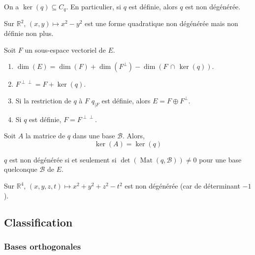   \begin{proposition}
    On a $\ker(q) \subseteq C_q$. En particulier, si $q$ est définie, alors $q$ est non dégénérée.
  \end{proposition}

  \begin{example}
    Sur $\mathbb{R}^2$, $(x, y) \mapsto x^2 - y^2$ est une forme quadratique non dégénérée mais non définie non plus.
  \end{example}

  \begin{proposition}
    Soit $F$ un sous-espace vectoriel de $E$.
    \begin{enumerate}[label={\bfseries(\roman*)}]
      \item $\dim(E) = \dim(F) + \dim(F^\perp) - \dim(F \, \cap \, \ker(q))$.
      \item $F^{\perp\perp} = F + \ker(q)$.
      \item Si la restriction de $q$ à $F$ $q_{|F}$ est définie, alors $E = F \oplus F^{\perp}$.
      \item Si $q$ est définie, $F = F^{\perp\perp}$.
    \end{enumerate}
  \end{proposition}

  \begin{proposition}
    Soit $A$ la matrice de $q$ dans une base $\mathcal{B}$. Alors,
    \[ \ker(A) = \ker(q) \]
  \end{proposition}


  \begin{corollary}
    $q$ est non dégénérée si et seulement si $\det(\operatorname{Mat}(q, \mathcal{B})) \neq 0$ pour une base quelconque $\mathcal{B}$ de $E$.
  \end{corollary}

  \begin{example}
    Sur $\mathbb{R}^4$, $(x, y, z, t) \mapsto x^2 + y^2 + z^2 - t^2$ est non dégénérée (car de déterminant $-1$).
  \end{example}

  \subsection{Classification}

  \subsubsection{Bases orthogonales}

